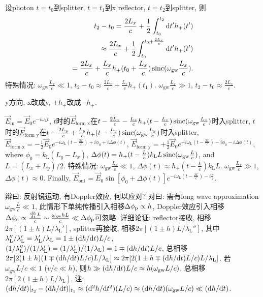 设photon $t=t_0$到splitter, $t=t_1$到x reflector, $t=t_2$到splitter, 则
\begin{eqnarray}
    t_2-t_0=\frac{2L_x}{c}+\frac{1}{2}\int^{t_2}_{t_0}\mathrm{d} t'h_+(t')\\
    \approx\frac{2L_x}{c}+\frac{1}{2}\int^{t_0+\frac{2L_x}{c}}_{t_0}\mathrm{d} t'h_+(t')\\
    =\frac{2L_x}{c}+\frac{L_x}{c}h_+(t_0+\frac{L_x}{c})\operatorname{sinc}(\omega_\text{gw}\frac{L_x}{c}).
\end{eqnarray}
特殊情况: $\omega_\text{gw}\frac{L_x}{c}\ll1$, $t_2-t_0\approx\frac{2L_x}{c}+\frac{L_x}{c}h_+(t_1)$. $\omega_\text{gw}\frac{L_x}{c}\gg1$, $t_2-t_0\approx\frac{2L_x}{c}$.

y方向, x改成y, $+h_+$改成$-h_+$.

$\vec{E}_\text{in}=\vec{E}_0e^{-i\omega_\text{L}t}$, $t$时的$\vec{E}_\text{form x}$在$t-\frac{2L_x}{c}-\frac{L_x}{c}h_+(t-\frac{L_x}{c})\operatorname{sinc}(\omega_\text{gw}\frac{L_x}{c})$时入splitter, $t$时的$\vec{E}_\text{form y}$在$t-\frac{2L_y}{c}+\frac{L_y}{c}h_+(t-\frac{L_y}{c})\operatorname{sinc}(\omega_\text{gw}\frac{L_y}{c})$时入splitter, $\vec{E}_\text{form x}=-\frac{1}{2}\vec{E}_0e^{-i\omega_\text{L}(t-\frac{2L}{c})+i\phi_0+i\Delta\phi(t)}$, $\vec{E}_\text{form y}=+\frac{1}{2}\vec{E}_0e^{-i\omega_\text{L}(t-\frac{2L}{c})-i\phi_0-i\Delta\phi(t)}$, where $\phi_0=k_\text{L}(L_y-L_x)$, $\Delta\phi(t)=h_+(t-\frac{L}{c})k_\text{L}L\operatorname{sinc}(\omega_\text{gw}\frac{L}{c})$, and $L=(L_x+L_y)/2$. 特殊情况: $\omega_\text{gw}\frac{L_x}{c}\ll1$, $\Delta\phi(t)\approx h_+(t-\frac{L}{c})k_\text{L}L$. $\omega_\text{gw}\frac{L_x}{c}\gg1$, $\Delta\phi(t)\approx0$. Finally, $\vec{E}_\text{out}=\vec{E}_0\sin[\phi_0+\Delta\phi(t)]e^{-i\omega_\text{L}(t-\frac{2L}{c})-i\frac{\pi}{2}}$.

辩曰: 反射镜运动, 有Doppler效应, 何以应对? 对曰: 需有long wave approximation $\omega_\text{gw}\frac{L}{c}\ll1$, 此情形下单纯传播引入相移$\Delta\phi_\text{p}\propto h$, Doppler效应引入相移$\Delta\phi_\text{d}\propto \frac{\frac{\mathrm{d} h}{\mathrm{d} t}L}{c}\sim\frac{\omega_\text{gw}hL}{c}\ll\Delta\phi_\text{p}$可忽略. 详细论证: reflector接收, 相移$2\pi[(1\pm h)L/\lambda_\text{L}']$, splitter再接收, 相移$2\pi[(1\pm h)L/\lambda_\text{L}'']$, 其中$\lambda_\text{L}''/\lambda_\text{L}'=\lambda_\text{L}'/\lambda_\text{L}=1\pm(\mathrm{d} h/\mathrm{d} t)L/c$, $(1/\lambda_\text{L}'')/(1/\lambda_\text{L}')=(1/\lambda_\text{L}')/(1/\lambda_\text{L})=1\mp(\mathrm{d} h/\mathrm{d} t)L/c$, 总相移$2\pi[2(1\pm h)(1\mp(\mathrm{d} h/\mathrm{d} t)L/c)L/\lambda_\text{L}]\approx2\pi[2(1\pm h\mp(\mathrm{d} h/\mathrm{d} t)L/c)L/\lambda_\text{L}]$. 若$\omega_\text{gw}L/c\ll1$ ($v/c\ll h$), 则$h\gg(\mathrm{d} h/\mathrm{d} t)L/c\approx h(\omega_\text{gw}L/c)$, 总相移$2\pi[2(1\pm h)L/\lambda_\text{L}]$. 注: $(\mathrm{d} h/\mathrm{d} t)|_{t_2}-(\mathrm{d} h/\mathrm{d} t)|_{t_1}\approx(\mathrm{d}^2 h/\mathrm{d} t^2)(L/c)\approx(\mathrm{d} h/\mathrm{d} t)(\omega_\text{gw}L/c)\ll(\mathrm{d} h/\mathrm{d} t)$.
